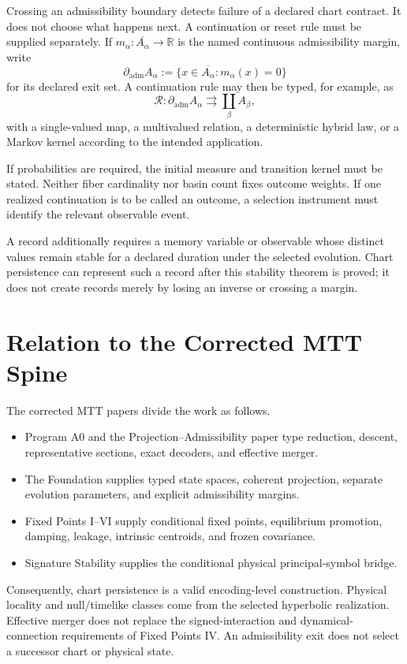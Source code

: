 \documentclass[11pt]{article}
\begin{document}
Crossing an admissibility boundary detects failure of a declared chart
contract. It does not choose what happens next. A continuation or reset rule
must be supplied separately. If
$m_\alpha:\overline{A_\alpha}\to\mathbb R$ is the named continuous
admissibility margin, write
\[
 \partial_{\mathrm{adm}}A_\alpha
 :=\{x\in\overline{A_\alpha}:m_\alpha(x)=0\}
\]
for its declared exit set. A continuation rule may then be typed, for example,
as
\[
 \mathcal R:
 \partial_{\mathrm{adm}} A_\alpha \rightrightarrows
 \coprod_\beta A_\beta,
\]
with a single-valued map, a multivalued relation, a deterministic hybrid law,
or a Markov kernel according to the intended application.

If probabilities are required, the initial measure and transition kernel must
be stated. Neither fiber cardinality nor basin count fixes outcome weights.
If one realized continuation is to be called an outcome, a selection
instrument must identify the relevant observable event.

A record additionally requires a memory variable or observable whose distinct
values remain stable for a declared duration under the selected evolution.
Chart persistence can represent such a record after this stability theorem is
proved; it does not create records merely by losing an inverse or crossing a
margin.

\section{Relation to the Corrected MTT Spine}

The corrected MTT papers divide the work as follows.
\begin{itemize}
\item Program A0 and the Projection--Admissibility paper type reduction,
descent, representative sections, exact decoders, and effective merger.
\item The Foundation supplies typed state spaces, coherent projection,
separate evolution parameters, and explicit admissibility margins.
\item Fixed Points I--VI supply conditional fixed points, equilibrium
promotion, damping, leakage, intrinsic centroids, and frozen covariance.
\item Signature Stability supplies the conditional physical
principal-symbol bridge.
\end{itemize}

Consequently, chart persistence is a valid encoding-level construction.
Physical locality and null/timelike classes come from the selected hyperbolic
realization. Effective merger does not replace the signed-interaction and
dynamical-connection requirements of Fixed Points IV. An admissibility exit
does not select a successor chart or physical state.
\end{document}
